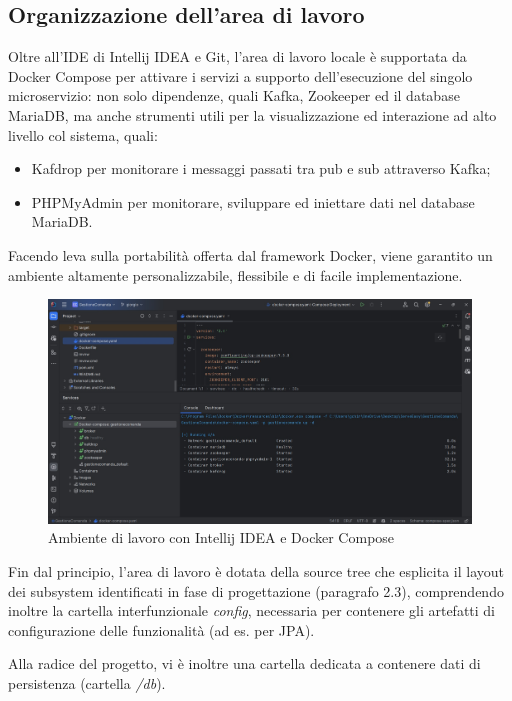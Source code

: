 \subsection{Organizzazione dell'area di lavoro}
Oltre all'IDE di Intellij IDEA e Git, l'area di lavoro locale è supportata da Docker Compose per attivare i servizi a supporto dell'esecuzione del singolo microservizio: non solo dipendenze, quali Kafka, Zookeeper ed il database MariaDB, ma anche strumenti utili per la visualizzazione ed interazione ad alto livello col sistema, quali:
\begin{itemize}
    \item Kafdrop per monitorare i messaggi passati tra pub e sub attraverso Kafka;
    \item PHPMyAdmin per monitorare, sviluppare ed iniettare dati nel database MariaDB.
\end{itemize}
Facendo leva sulla portabilità offerta dal framework Docker, viene garantito un ambiente altamente personalizzabile, flessibile e di facile implementazione. 

\begin{figure}[htbp]
	\centering
	\includegraphics[scale=0.36]{iterazione1/images/IDEIDEA.jpg}
	\caption{Ambiente di lavoro con Intellij IDEA e Docker Compose
 \label{fig:IDEAit1}}
\end{figure}

Fin dal principio, l'area di lavoro è dotata della source tree che esplicita il layout dei subsystem identificati in fase di progettazione (paragrafo 2.3), comprendendo inoltre la cartella interfunzionale \textit{config}, necessaria per contenere gli artefatti di configurazione delle funzionalità (ad es. per JPA).

Alla radice del progetto, vi è inoltre una cartella dedicata a contenere dati di persistenza (cartella \textit{/db}).

